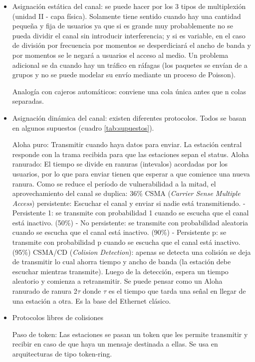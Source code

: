 \documentclass{book}
\begin{document}
	\begin{itemize}
		\item Asignación estática del canal: se puede hacer por los 3 tipos de multiplexión (unidad II - capa física). Solamente tiene sentido cuando hay una cantidad pequeña y fija de usuarios ya que si es grande muy probablemente no se pueda dividir el canal sin introducir interferencia; y si es variable, en el caso de división por frecuencia por momentos se desperdiciará el ancho de banda y por momentos se le negará a usuarios el acceso al medio. Un problema adicional se da cuando hay un tráfico en ráfagas (los paquetes se envían de a grupos y no se puede modelar su envío mediante un proceso de Poisson).
		
		\subitem Analogía con cajeros automáticos: conviene una cola única antes que n colas separadas.
		
		\item Asignación dinámica del canal: existen diferentes protocolos. Todos se basan en algunos supuestos (cuadro \ref{tab:supuestos}).
		
		\subitem * Aloha puro: Transmitir cuando haya datos para enviar. La estación central responde con la trama recibida para que las estaciones sepan el status.
		\subitem * Aloha ranurado: El tiempo se divide en ranuras (intevalos) acordadas por los usuarios, por lo que para enviar tienen que esperar a que comience una nueva ranura. Como se reduce el período de vulnerabilidad a la mitad, el aprovechamiento del canal se duplica: 36\%
		\subitem * CSMA (\textit{Carrier Sense Multiple Access}) persistente: Escuchar el canal y enviar si nadie está transmitiendo.
		\subsubitem - Persistente 1: se transmite con probabilidad 1 cuando se escucha que el canal está inactivo. (50\%)
		\subsubitem - No persistente: se transmite con probabilidad aleatoria cuando se escucha que el canal está inactivo. (90\%)
		\subsubitem- Persistente p: se transmite con probabilidad p cuando se escucha que el canal está inactivo. (95\%)
		\subitem * CSMA/CD (\textit{Colision Detection}): apenas se detecta una colisión se deja de transmitir lo cual ahorra tiempo y ancho de banda (la estación debe escuchar mientras transmite). Luego de la detección, espera un tiempo aleatorio y comienza a retransmitir. Se puede pensar como un Aloha ranurado de ranura 2$\tau$ donde $\tau$ es el tiempo que tarda una señal en llegar de una estación a otra. Es la base del Ethernet clásico.
		
		\item Protocolos libres de colisiones
		
		\subitem * Paso de token: Las estaciones se pasan un token que les permite transmitir y recibir en caso de que haya un mensaje destinada a ellas. Se usa en arquitecturas de tipo token-ring.
		
	\end{itemize}
	
\end{document}
